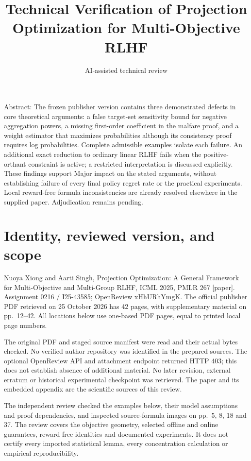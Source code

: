 \documentclass[10pt]{article}
\title{Technical Verification of Projection Optimization for Multi-Objective RLHF}
\author{AI-assisted technical review}
\date{}
\begin{document}
\maketitle
Abstract: The frozen publisher version contains three demonstrated defects in core theoretical arguments: a false target-set sensitivity bound for negative aggregation powers, a missing first-order coefficient in the malfare proof, and a weight estimator that maximizes probabilities although its consistency proof requires log probabilities. Complete admissible examples isolate each failure. An additional exact reduction to ordinary linear RLHF fails when the positive-orthant constraint is active; a restricted interpretation is discussed explicitly. These findings support Major impact on the stated arguments, without establishing failure of every final policy regret rate or the practical experiments. Local reward-free formula inconsistencies are already resolved elsewhere in the supplied paper. Adjudication remains pending.\par
\section*{Identity, reviewed version, and scope}
Nuoya Xiong and Aarti Singh, Projection Optimization: A General Framework for Multi-Objective and Multi-Group RLHF, ICML 2025, PMLR 267 [paper]. Assignment 0216 / I25-43585; OpenReview xHhURhYmgK. The official publisher PDF retrieved on 25 October 2026 has 42 pages, with supplementary material on pp. 12–42. All locations below use one-based PDF pages, equal to printed local page numbers.\par
The original PDF and staged source manifest were read and their actual bytes checked. No verified author repository was identified in the prepared sources. The optional OpenReview API and attachment endpoint returned HTTP 403; this does not establish absence of additional material. No later revision, external erratum or historical experimental checkpoint was retrieved. The paper and its embedded appendix are the scientific sources of this review.\par
The independent review checked the examples below, their model assumptions and proof dependencies, and inspected source-formula images on pp. 5, 8, 18 and 37. The review covers the objective geometry, selected offline and online guarantees, reward-free identities and documented experiments. It does not certify every imported statistical lemma, every concentration calculation or empirical reproducibility.\par
\end{document}
